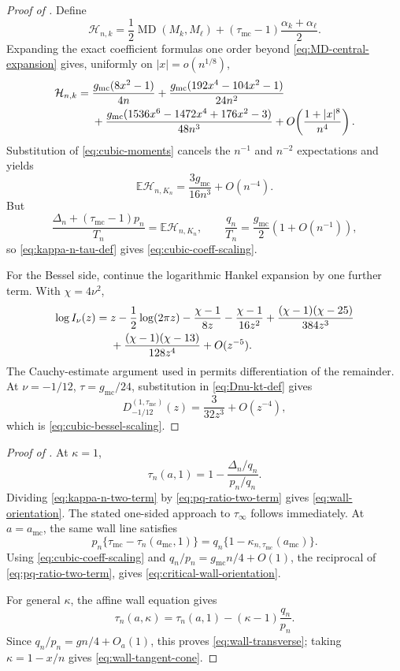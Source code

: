 \documentclass[11pt,a4paper]{amsart}
\numberwithin{equation}{section}
\theoremstyle{plain}
\theoremstyle{definition}
\newcommand{\E}{\mathbb E}
\newcommand{\MD}{\operatorname{MD}}
\begin{document}
\begin{proof}[Proof of ]
Define
\[
 \mathcal H_{n,k}
 =\frac12\MD(M_k,M_\ell)
 +(\tau_{\mathrm{mc}}-1)\frac{\alpha_k+\alpha_\ell}{2}.
\]
Expanding the exact coefficient formulas one order beyond
\eqref{eq:MD-central-expansion} gives, uniformly on
\(|x|=o(n^{1/8})\),
\begin{align}\label{eq:cubic-integrand}
 \mathcal H_{n,k}={}&
 \frac{g_{\mathrm{mc}}(8x^2-1)}{4n}
 +\frac{g_{\mathrm{mc}}(192x^4-104x^2-1)}{24n^2}\notag\\
 &+\frac{g_{\mathrm{mc}}(1536x^6-1472x^4+176x^2-3)}{48n^3}
 +O\!\left(\frac{1+|x|^8}{n^4}\right).
\end{align}
Substitution of \eqref{eq:cubic-moments} cancels the \(n^{-1}\) and
\(n^{-2}\) expectations and yields
\begin{equation}\label{eq:cubic-H-expectation}
 \E\mathcal H_{n,K_n}
 =\frac{3g_{\mathrm{mc}}}{16n^3}+O(n^{-4}).
\end{equation}
But
\[
 \frac{\Delta_n+(\tau_{\mathrm{mc}}-1)p_n}{T_n}
 =\E\mathcal H_{n,K_n},
 \qquad
 \frac{q_n}{T_n}=\frac{g_{\mathrm{mc}}}{2}(1+O(n^{-1})),
\]
so \eqref{eq:kappa-n-tau-def} gives
\eqref{eq:cubic-coeff-scaling}.

For the Bessel side, continue the logarithmic Hankel expansion by one further
term.  With \(\chi=4\nu^2\),
\begin{align}\label{eq:log-I-four-term}
 \log I_\nu(z)={}&z-\frac12\log(2\pi z)
 -\frac{\chi-1}{8z}-\frac{\chi-1}{16z^2}
 +\frac{(\chi-1)(\chi-25)}{384z^3}\notag\\
 &+\frac{(\chi-1)(\chi-13)}{128z^4}+O(z^{-5}).
\end{align}
The Cauchy-estimate argument used in  permits
differentiation of the remainder.
At \(\nu=-1/12\), \(\tau=g_{\mathrm{mc}}/24\), substitution in
\eqref{eq:Dnu-kt-def} gives
\[
 D_{-1/12}^{(1,\tau_{\mathrm{mc}})}(z)
 =\frac{3}{32z^3}+O(z^{-4}),
\]
which is \eqref{eq:cubic-bessel-scaling}.
\end{proof}

\begin{proof}[Proof of ]
At \(\kappa=1\),
\[
 \tau_n(a,1)=1-\frac{\Delta_n/q_n}{p_n/q_n}.
\]
Dividing \eqref{eq:kappa-n-two-term} by
\eqref{eq:pq-ratio-two-term} gives
\eqref{eq:wall-orientation}.  The stated one-sided approach to
\(\tau_\infty\) follows immediately.  At \(a=a_{\mathrm{mc}}\), the same wall
line satisfies
\[
 p_n\{\tau_{\mathrm{mc}}-\tau_n(a_{\mathrm{mc}},1)\}
 =q_n\{1-\kappa_{n,\tau_{\mathrm{mc}}}(a_{\mathrm{mc}})\}.
\]
Using \eqref{eq:cubic-coeff-scaling} and
\(q_n/p_n=g_{\mathrm{mc}}n/4+O(1)\), the reciprocal of
\eqref{eq:pq-ratio-two-term}, gives
\eqref{eq:critical-wall-orientation}.

For general \(\kappa\), the affine wall equation gives
\[
 \tau_n(a,\kappa)=\tau_n(a,1)-(\kappa-1)\frac{q_n}{p_n}.
\]
Since \(q_n/p_n=gn/4+O_a(1)\), this proves
\eqref{eq:wall-transverse}; taking \(\kappa=1-x/n\) gives
\eqref{eq:wall-tangent-cone}.
\end{proof}
\end{document}

